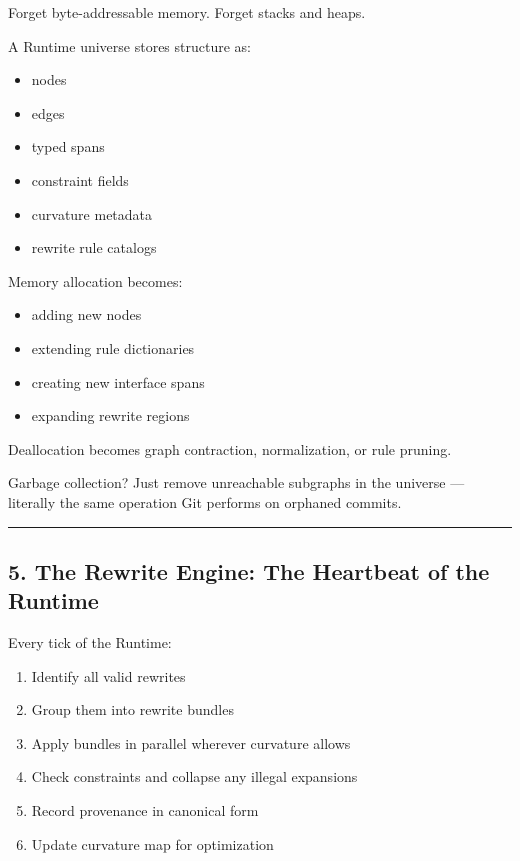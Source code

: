 Forget byte-addressable memory. Forget stacks and heaps.

A Runtime universe stores structure as:

\begin{itemize}
\tightlist
\item
  nodes
\item
  edges
\item
  typed spans
\item
  constraint fields
\item
  curvature metadata
\item
  rewrite rule catalogs
\end{itemize}

Memory allocation becomes:

\begin{itemize}
\tightlist
\item
  adding new nodes
\item
  extending rule dictionaries
\item
  creating new interface spans
\item
  expanding rewrite regions
\end{itemize}

Deallocation becomes graph contraction, normalization, or rule pruning.

Garbage collection? Just remove unreachable subgraphs in the universe
--- literally the same operation Git performs on orphaned commits.

\begin{center}\rule{0.5\linewidth}{0.5pt}\end{center}

\subsection{5. The Rewrite Engine: The Heartbeat of the
Runtime}\label{the-rewrite-engine-the-heartbeat-of-the-runtime}

Every tick of the Runtime:

\begin{enumerate}
\def\labelenumi{\arabic{enumi}.}
\tightlist
\item
  Identify all valid rewrites
\item
  Group them into rewrite bundles
\item
  Apply bundles in parallel wherever curvature allows
\item
  Check constraints and collapse any illegal expansions
\item
  Record provenance in canonical form
\item
  Update curvature map for optimization
\end{enumerate}

